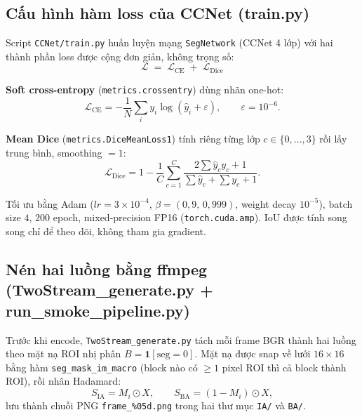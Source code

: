\subsection{Cấu hình hàm loss của CCNet (train.py)}
\label{sec:loss_ccnet}

Script \texttt{CCNet/train.py} huấn luyện mạng \texttt{SegNetwork} (CCNet 4 lớp) với hai thành phần loss được cộng đơn giản, không trọng số:
\begin{equation}
  \mathcal{L} \;=\; \mathcal{L}_{\mathrm{CE}} \;+\; \mathcal{L}_{\mathrm{Dice}}
  \label{eq:ccnet_loss}
\end{equation}

\textbf{Soft cross-entropy} (\texttt{metrics.crossentry}) dùng nhãn one-hot:
\begin{equation}
  \mathcal{L}_{\mathrm{CE}} = -\frac{1}{N}\sum_{i} y_i \log(\hat{y}_i + \varepsilon),
  \qquad \varepsilon = 10^{-6}.
\end{equation}

\textbf{Mean Dice} (\texttt{metrics.DiceMeanLoss1}) tính riêng từng lớp $c \in \{0,\dots,3\}$ rồi lấy trung bình, smoothing $=1$:
\begin{equation}
  \mathcal{L}_{\mathrm{Dice}} = 1 - \frac{1}{C}\sum_{c=1}^{C}\frac{2\sum \hat{y}_c y_c + 1}{\sum \hat{y}_c + \sum y_c + 1}.
\end{equation}

Tối ưu bằng Adam ($lr = 3\!\times\!10^{-4}$, $\beta = (0{,}9,\,0{,}999)$, weight decay $10^{-5}$), batch size $4$, $200$ epoch, mixed-precision FP16 (\texttt{torch.cuda.amp}). IoU được tính song song chỉ để theo dõi, không tham gia gradient.

\subsection{Nén hai luồng bằng ffmpeg (TwoStream\_generate.py + run\_smoke\_pipeline.py)}
\label{sec:ccnet_encode}

Trước khi encode, \texttt{TwoStream\_generate.py} tách mỗi frame BGR thành hai luồng theo mặt nạ ROI nhị phân $B = \mathbf{1}[\text{seg}=0]$. Mặt nạ được snap về lưới $16\times16$ bằng hàm \texttt{seg\_mask\_im\_macro} (block nào có $\geq 1$ pixel ROI thì cả block thành ROI), rồi nhân Hadamard:
\begin{equation*}
  S_{\mathrm{IA}} = M_i \odot X, \qquad S_{\mathrm{BA}} = (1-M_i) \odot X,
\end{equation*}
lưu thành chuỗi PNG \texttt{frame\_\%05d.png} trong hai thư mục \texttt{IA/} và \texttt{BA/}.

